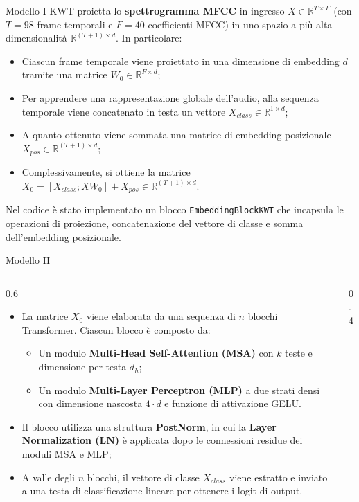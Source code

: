 \documentclass[aspectratio=169]{beamer}
\begin{document}
\begin{frame}{Modello I}
  KWT proietta lo \textbf{spettrogramma MFCC} in ingresso $X \in \mathbb{R}^{T \times F}$ (con $T=98$ frame temporali e $F=40$ coefficienti MFCC) in uno spazio a più alta dimensionalità $\mathbb{R}^{(T+1) \times d}$. In particolare:
  \begin{itemize}
    \item Ciascun frame temporale viene proiettato in una dimensione di embedding $d$ tramite una matrice $W_0 \in \mathbb{R}^{F \times d}$;
    \item Per apprendere una rappresentazione globale dell'audio, alla sequenza temporale viene concatenato in testa un vettore $X_{class} \in \mathbb{R}^{1 \times d}$;
    \item A quanto ottenuto viene sommata una matrice di embedding posizionale $X_{pos} \in \mathbb{R}^{(T+1) \times d}$;
    \item Complessivamente, si ottiene la matrice $X_0 = [X_{class}; X W_0] + X_{pos} \in \mathbb{R}^{(T+1) \times d}$.
  \end{itemize}
  Nel codice è stato implementato un blocco \texttt{EmbeddingBlockKWT} che incapsula le operazioni di proiezione, concatenazione del vettore di classe e somma dell'embedding posizionale.
\end{frame}

\begin{frame}{Modello II}
  \begin{columns}[c]
    \begin{column}{0.6\textwidth}
      \begin{itemize}
        \item La matrice $X_0$ viene elaborata da una sequenza di $n$ blocchi Transformer. Ciascun blocco è composto da:
        \begin{itemize}
          \item Un modulo \textbf{Multi-Head Self-Attention (MSA)} con $k$ teste e dimensione per testa $d_h$;
          \item Un modulo \textbf{Multi-Layer Perceptron (MLP)} a due strati densi con dimensione nascosta $4 \cdot d$ e funzione di attivazione GELU.
        \end{itemize}
        \item Il blocco utilizza una struttura \textbf{PostNorm}, in cui la \textbf{Layer Normalization (LN)} è applicata dopo le connessioni residue dei moduli MSA e MLP;
        \item A valle degli $n$ blocchi, il vettore di classe $X_{class}$ viene estratto e inviato a una testa di classificazione lineare per ottenere i logit di output.
      \end{itemize}
    \end{column}
    \begin{column}{0.4\textwidth}
      \centering
      
    \end{column}
  \end{columns}
\end{frame}
\end{document}

